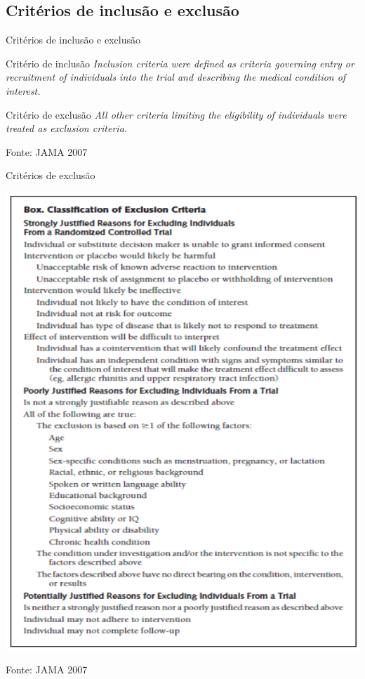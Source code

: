 \documentclass{beamer}
\begin{document}
\subsection{Critérios de inclusão e exclusão}

\begin{frame}{Critérios de inclusão e exclusão}
  \begin{block}{Critério de inclusão}
    {\em Inclusion criteria were defined as criteria governing entry or
    recruitment of individuals into the trial and describing the
    medical condition of interest.}
  \end{block}
  \begin{block}{Critério de exclusão}
    {\em All other criteria limiting the eligibility of individuals were
    treated as exclusion criteria.}
  \end{block}

  \vfill
  \small
  Fonte: JAMA 2007
\end{frame}

\begin{frame}{Critérios de exclusão}
  \begin{center}
    \includegraphics[height=.9\textheight]{Etapas/box-crit-exclusao}
  \end{center}
  \small
  Fonte: JAMA 2007
\end{frame}
\end{document}
